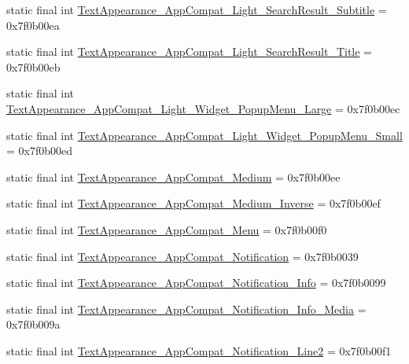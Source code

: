 \begin{CompactItemize}
\item 
static final int \hyperlink{classandroid_1_1support_1_1v7_1_1mediarouter_1_1_r_1_1style_d9093df8b48cbcf0b178604dee5332e8}{TextAppearance\_\-AppCompat\_\-Light\_\-SearchResult\_\-Subtitle} = 0x7f0b00ea
\item 
static final int \hyperlink{classandroid_1_1support_1_1v7_1_1mediarouter_1_1_r_1_1style_0c22600f3fb8e42cbc8909a17158182b}{TextAppearance\_\-AppCompat\_\-Light\_\-SearchResult\_\-Title} = 0x7f0b00eb
\item 
static final int \hyperlink{classandroid_1_1support_1_1v7_1_1mediarouter_1_1_r_1_1style_f16bbab0b74960d0d31dfe1dd56adfd1}{TextAppearance\_\-AppCompat\_\-Light\_\-Widget\_\-PopupMenu\_\-Large} = 0x7f0b00ec
\item 
static final int \hyperlink{classandroid_1_1support_1_1v7_1_1mediarouter_1_1_r_1_1style_c7c12a43e205a055586ca11eaf81570e}{TextAppearance\_\-AppCompat\_\-Light\_\-Widget\_\-PopupMenu\_\-Small} = 0x7f0b00ed
\item 
static final int \hyperlink{classandroid_1_1support_1_1v7_1_1mediarouter_1_1_r_1_1style_080317830df4d43df08e6c47a1c78625}{TextAppearance\_\-AppCompat\_\-Medium} = 0x7f0b00ee
\item 
static final int \hyperlink{classandroid_1_1support_1_1v7_1_1mediarouter_1_1_r_1_1style_5b15cd5beba40170d05294a5cc0736c1}{TextAppearance\_\-AppCompat\_\-Medium\_\-Inverse} = 0x7f0b00ef
\item 
static final int \hyperlink{classandroid_1_1support_1_1v7_1_1mediarouter_1_1_r_1_1style_0dbcb43d247db0c2963ad34a982f660b}{TextAppearance\_\-AppCompat\_\-Menu} = 0x7f0b00f0
\item 
static final int \hyperlink{classandroid_1_1support_1_1v7_1_1mediarouter_1_1_r_1_1style_d73ba984946cc181c7a64151f0dc81ce}{TextAppearance\_\-AppCompat\_\-Notification} = 0x7f0b0039
\item 
static final int \hyperlink{classandroid_1_1support_1_1v7_1_1mediarouter_1_1_r_1_1style_262b6cb6d0e1f371fe27c90845b7dcb9}{TextAppearance\_\-AppCompat\_\-Notification\_\-Info} = 0x7f0b0099
\item 
static final int \hyperlink{classandroid_1_1support_1_1v7_1_1mediarouter_1_1_r_1_1style_f52a294cd6ecf9998f25015d1f47ef99}{TextAppearance\_\-AppCompat\_\-Notification\_\-Info\_\-Media} = 0x7f0b009a
\item 
static final int \hyperlink{classandroid_1_1support_1_1v7_1_1mediarouter_1_1_r_1_1style_be10b62a6bd714587aeb0074cf693ef5}{TextAppearance\_\-AppCompat\_\-Notification\_\-Line2} = 0x7f0b00f1

\end{CompactItemize}
